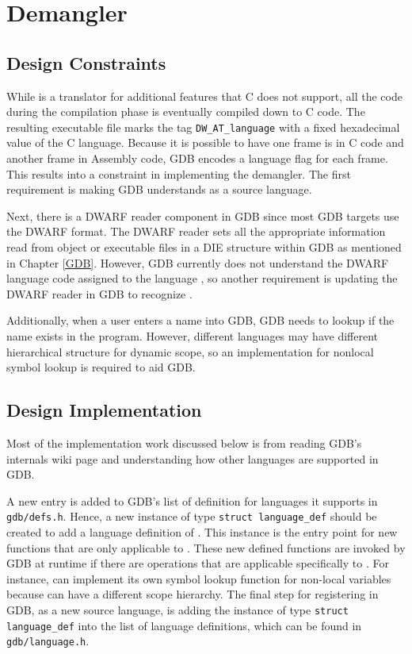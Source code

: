 \chapter{\CFAS Demangler} \label{demangler}

\section{Design Constraints}
While \CFAS is a translator for additional features that C does not support, all
the code during the compilation phase is eventually compiled down to C code.
The resulting executable file marks the tag \verb|DW_AT_language| with a
fixed hexadecimal value of the C language. Because it is possible to have one frame is in C code and another
frame in Assembly code, GDB encodes a language flag for each frame. This
results into a constraint in implementing the demangler. The first requirement is
making GDB understands \CFAS as a source language.

Next, there is a DWARF reader component in GDB since most GDB targets use the DWARF
format. The DWARF reader sets all the appropriate information read from object or
executable files in a DIE structure within GDB as mentioned in Chapter
\ref{GDB}. However, GDB currently does not understand the DWARF language code
assigned to the
language \CFA, so another requirement is updating the DWARF reader in GDB to
recognize \CFA.

Additionally, when a user enters a name into GDB, GDB needs to lookup if the
name exists in the program. However, different languages may have different
hierarchical structure for dynamic scope, so an implementation for nonlocal
symbol lookup is required to aid GDB.

\section{Design Implementation}
Most of the implementation work discussed below is from reading GDB's internals
wiki page and understanding how other languages are supported in GDB\cite{reference5}.

A new entry is added to GDB's list of definition for languages it supports in
\verb|gdb/defs.h|. Hence, a new instance of type \verb|struct language_def|
should be created to add a language definition of \CFAS. This instance is the
entry point for new functions that are only applicable to \CFA. These new
defined functions are invoked by GDB at runtime if there are operations that
are applicable specifically to \CFA. For instance, \CFAS can implement its
own symbol lookup function for non-local variables because \CFAS can have a
different scope hierarchy. The final step for registering \CFAS in GDB, as a new
source language, is adding the instance of type \verb|struct language_def| into
the list of language definitions, which can be found in
\verb|gdb/language.h|.


